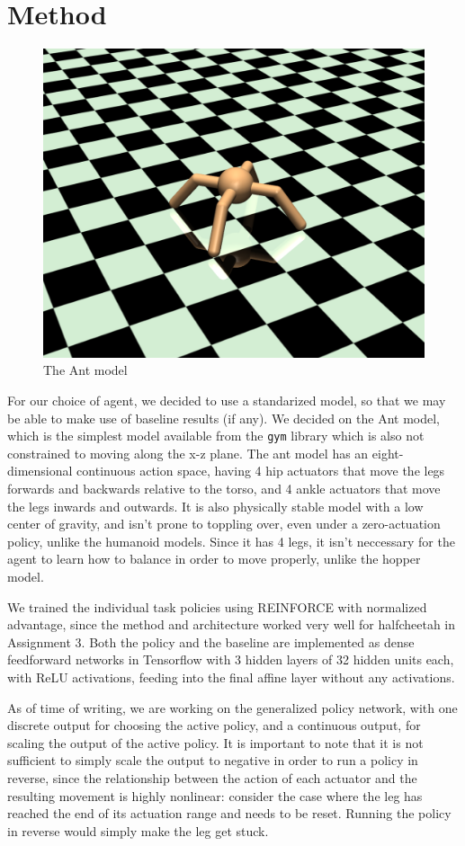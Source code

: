 \documentclass{article}
\begin{document}
\section{Method}
\begin{figure}[H]
	\centering
	\includegraphics[width=0.9\linewidth]{ant_agent.png}
	\caption{The Ant model}
\end{figure}
For our choice of agent, we decided to use a standarized model, so that we may be able to make use of baseline results (if any). We decided on the Ant model, which is the simplest model available from the \texttt{gym} library which is also not constrained to moving along the x-z plane. The ant model has an eight-dimensional continuous action space, having 4 hip actuators that move the legs forwards and backwards relative to the torso, and 4 ankle actuators that move the legs inwards and outwards. It is also physically stable model with a low center of gravity, and isn't prone to toppling over, even under a zero-actuation policy, unlike the humanoid models. Since it has 4 legs, it isn't neccessary for the agent to learn how to balance in order to move properly, unlike the hopper model.

We trained the individual task policies using REINFORCE with normalized advantage, since the method and architecture worked very well for halfcheetah in Assignment 3. Both the policy and the baseline are implemented as dense feedforward networks in Tensorflow \cite{abadi2016tensorflow} with 3 hidden layers of 32 hidden units each, with ReLU activations, feeding into the final affine layer without any activations.

As of time of writing, we are working on the generalized policy network, with one discrete output for choosing the active policy, and a continuous output, for scaling the output of the active policy. It is important to note that it is not sufficient to simply scale the output to negative in order to run a policy in reverse, since the relationship between the action of each actuator and the resulting movement is highly nonlinear: consider the case where the leg has reached the end of its actuation range and needs to be reset. Running the policy in reverse would simply make the leg get stuck.
\end{document}
